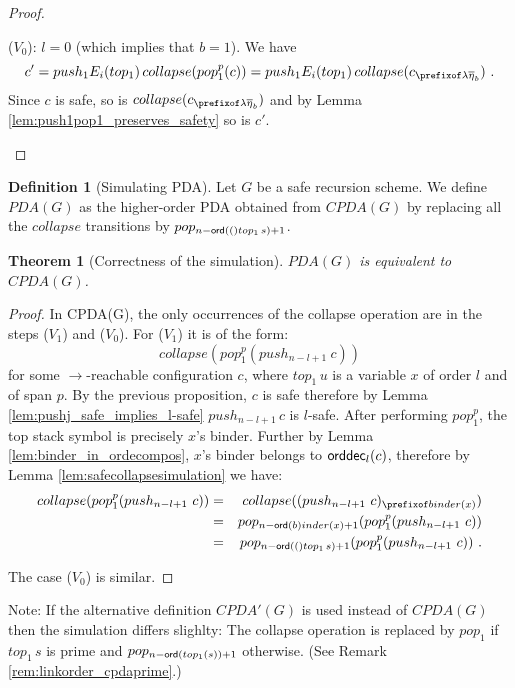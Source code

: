 \documentclass[a4paper]{article}
\newtheorem{theorem}{Theorem}[section]
\theoremstyle{remark}
\theoremstyle{definition}
\newtheorem{definition}{Definition}[section]
\newcommand\orddec{{\sf orddec}}
\begin{document}
\begin{proof}
\begin{itemize}
\begin{compactitem}
\item ($V_0$): $l=0$ (which implies that  $b=1$). We have 
 $$c' = push_1 E_i(top_1)\,collapse(pop_1^p(c)) =
push_1 E_i(top_1)\,collapse(c_{\prefixof \lambda \overline\eta_b}) \ .$$
Since $c$ is safe, so is $collapse(c_{\prefixof \lambda \overline\eta_b})$ and
by Lemma \ref{lem:push1pop1_preserves_safety} so is $c'$.
\qedhere
\end{compactitem}
\end{itemize}
\end{proof}

\begin{definition}[Simulating PDA]
Let $G$ be a safe recursion scheme.
We define $PDA(G)$ as the higher-order PDA obtained from
$CPDA(G)$ by replacing all the $collapse$ transitions by $pop_{n-{\sf ord}(()top_1\,s)+1}$.
\end{definition}

\begin{theorem}[Correctness of the simulation]
$PDA(G)$ is equivalent to $CPDA(G)$.
\end{theorem}
\begin{proof}
In CPDA(G), the only occurrences of the collapse operation are in the steps ($V_1$) and ($V_0$). For ($V_1$) it is of the form:
$$collapse(pop_1^p(push_{n-l+1}~c))$$
for some $\rightarrow$-reachable configuration $c$, where $top_1\,u$ is a variable $x$ of order $l$ and of span $p$.
By the previous proposition, $c$ is safe therefore by Lemma \ref{lem:pushj_safe_implies_l-safe} $push_{n-l+1}\, c$ is $l$-safe. After performing $pop_1^p$, the top stack symbol is precisely $x$'s binder. Further
by Lemma \ref{lem:binder_in_ordecompos}, $x$'s binder belongs to $\orddec_l(c)$, therefore 
by Lemma \ref{lem:safecollapsesimulation} we have:
\begin{eqnarray*}
collapse(pop_1^p(push_{n-l+1}~c)) &=&  collapse((push_{n-l+1}~c)_{\prefixof binder(x)}) \\
&=& pop_{n-\ord binder(x) +1} ( pop_1^p(push_{n-l+1}~c) ) \\
&=& pop_{n-\ord(top_1\,s) +1} ( pop_1^p(push_{n-l+1}~c) ) \ .
\end{eqnarray*}

The case ($V_0$) is similar.
\end{proof}

Note: If the alternative definition $CPDA'(G)$ is used instead of $CPDA(G)$ then 
the simulation differs slighlty: The collapse operation is replaced by $pop_1$ if $top_1\, s$ is prime and $pop_{n-{\sf ord}(top_1(s))+1}$ otherwise.
 (See Remark \ref{rem:linkorder_cpdaprime}.)

 


\end{document}

